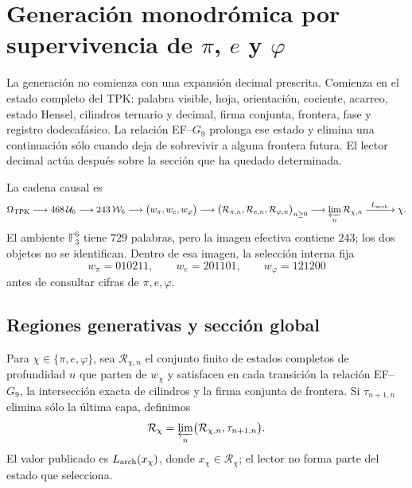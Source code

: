 \chapter{Generación monodrómica por supervivencia de
\texorpdfstring{\(\pi\), \(e\) y \(\varphi\)}{pi, e y phi}}
\label{chap:generacion-numeros-rev6}
\label{chap:biografias-numeros-rev6}

La generación no comienza con una expansión decimal prescrita. Comienza en
el estado completo del TPK: palabra visible, hoja, orientación, cociente,
acarreo, estado Hensel, cilindros ternario y decimal, firma conjunta,
frontera, fase y registro dodecafásico. La relación EF--\(G_9\) prolonga ese
estado y elimina una continuación sólo cuando deja de sobrevivir a alguna
frontera futura. El lector decimal actúa después sobre la sección que ha
quedado determinada.

La cadena causal es
\[
\Omega_{\rm TPK}
\longrightarrow 468\,\mathcal U_6
\longrightarrow 243\,\mathcal W_6
\longrightarrow
\bigl(w_\pi,w_e,w_\varphi\bigr)
\longrightarrow
\bigl(\mathcal R_{\pi,n},\mathcal R_{e,n},
      \mathcal R_{\varphi,n}\bigr)_{n\geq0}
\longrightarrow
\varprojlim_n\mathcal R_{\chi,n}
\xrightarrow{\ L_{\rm arch}\ }
\chi .
\]
El ambiente \(\mathbb F_3^6\) tiene \(729\) palabras, pero la imagen
efectiva contiene \(243\); los dos objetos no se identifican. Dentro de esa
imagen, la selección interna fija
\[
w_\pi=010211,\qquad
w_e=201101,\qquad
w_\varphi=121200
\]
antes de consultar cifras de \(\pi,e,\varphi\).

\section{Regiones generativas y sección global}

\begin{definition}
\label{def:region-generativa-rev6}
Para \(\chi\in\{\pi,e,\varphi\}\), sea \(\mathcal R_{\chi,n}\) el conjunto
finito de estados completos de profundidad \(n\) que parten de
\(w_\chi\) y satisfacen en cada transición la relación EF--\(G_9\), la
intersección exacta de cilindros y la firma conjunta de frontera. Si
\(\tau_{n+1,n}\) elimina sólo la última capa, definimos
\[
\mathcal R_\chi
=\varprojlim_n
\bigl(\mathcal R_{\chi,n},\tau_{n+1,n}\bigr).
\]
El valor publicado es \(L_{\rm arch}(x_\chi)\), donde
\(x_\chi\in\mathcal R_\chi\); el lector no forma parte del estado que
selecciona.
\end{definition}


